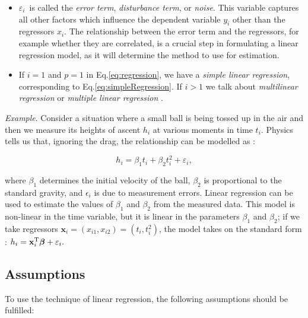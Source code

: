 \begin{itemize}
  \item $\varepsilon_i\,$ is called the \emph{error term}, \emph{disturbance term}, or \emph{noise}. This variable captures all other factors which influence the dependent variable $y_i$ other than the regressors $x_i$. The relationship between the error term and the regressors, for example whether they are correlated, is a crucial step in formulating a linear regression model, as it will determine the method to use for estimation.
  \item If $i=1$ and $p=1$ in Eq.\ref{eq:regression}, we have a \emph{simple linear regression}, corresponding to Eq.\ref{eq:simpleRegression}. If $i>1$ we talk about \emph{multilinear regression}  or \emph{multiple linear regression} .

\end{itemize}
\emph{Example}. Consider a situation where a small ball is being tossed up in the air and then we measure its heights of ascent $h_i$ at various moments in time $t_i$. Physics tells us that, ignoring the drag, the relationship can be modelled as
:

\begin{equation}
 h_i = \beta_1 t_i + \beta_2 t_i^2 + \varepsilon_i,
\end{equation}

where $\beta_1$ determines the initial velocity of the ball, $\beta_2$ is proportional to the standard gravity, and $\epsilon_i$ is due to measurement errors. Linear regression can be used to estimate the values of $\beta_1$ and $\beta_2$ from the measured data. This model is non-linear in the time variable, but it is linear in the parameters $\beta_1$ and $\beta_2$; if we take regressors $\mathbf{x}_i = (x_{i1},x_{i2}) = (t_i,t_i^2)$, the model takes on the standard form
:
 $h_i = \mathbf{x}^{\rm T}_i\boldsymbol\beta + \varepsilon_i.$

\subsection{Assumptions}

To use the technique of linear regression, the following assumptions should be fulfilled:

